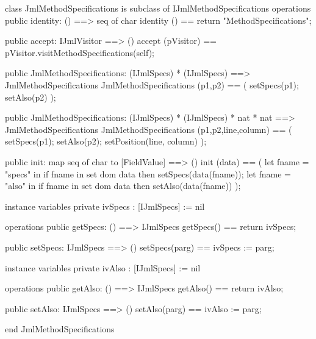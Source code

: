 \begin{vdm_al}
class JmlMethodSpecifications is subclass of IJmlMethodSpecifications
operations
  public identity: () ==> seq of char
  identity () == return "MethodSpecifications";

  public accept: IJmlVisitor ==> ()
  accept (pVisitor) == pVisitor.visitMethodSpecifications(self);

  public JmlMethodSpecifications:
    (IJmlSpecs) *
    (IJmlSpecs) ==> JmlMethodSpecifications
  JmlMethodSpecifications (p1,p2) == 
    ( setSpecs(p1);
      setAlso(p2) );

  public JmlMethodSpecifications:
    (IJmlSpecs) *
    (IJmlSpecs) *
    nat *
    nat ==> JmlMethodSpecifications
  JmlMethodSpecifications (p1,p2,line,column) == 
    ( setSpecs(p1);
      setAlso(p2);
      setPosition(line, column) );

  public init: map seq of char to [FieldValue] ==> ()
  init (data) ==
    ( let fname = "specs" in
        if fname in set dom data
        then setSpecs(data(fname));
      let fname = "also" in
        if fname in set dom data
        then setAlso(data(fname)) );

instance variables
  private ivSpecs : [IJmlSpecs] := nil

operations
  public getSpecs: () ==> IJmlSpecs
  getSpecs() == return ivSpecs;

  public setSpecs: IJmlSpecs ==> ()
  setSpecs(parg) == ivSpecs := parg;

instance variables
  private ivAlso : [IJmlSpecs] := nil

operations
  public getAlso: () ==> IJmlSpecs
  getAlso() == return ivAlso;

  public setAlso: IJmlSpecs ==> ()
  setAlso(parg) == ivAlso := parg;

end JmlMethodSpecifications
\end{vdm_al}

